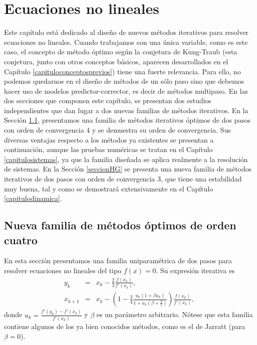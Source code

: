 
\chapter{Ecuaciones no lineales}\label{capituloecuaciones}

Este capítulo está dedicado al diseño de nuevos métodos iterativos para resolver ecuaciones no lineales. Cuando trabajamos con una única variable, como es este caso, el concepto de método óptimo según la conjetura de Kung-Traub (esta conjetura, junto con otros conceptos básicos, aparecen desarrollados en el Capítulo \ref{capituloconceptosprevios}) tiene una fuerte relevancia. Para ello, no podemos quedarnos en el diseño de métodos de un sólo paso sino que debemos hacer uso de modelos predictor-corrector, es decir de métodos multipaso. En las dos secciones que componen este capítulo, se presentan dos estudios independientes que dan lugar a dos nuevas familias de métodos iterativos. En la Sección \ref{seccionlichen}, presentamos una familia de métodos iterativos óptimos de dos pasos con orden de convergencia 4 y se demuestra su orden de convergencia. Sus diversas ventajas respecto a los métodos ya existentes se presentan a continuación, aunque las pruebas numéricas se tratan en el Capítulo \ref{capitulosistemas}, ya que la familia diseñada se aplica realmente a la resolución de sistemas. En la Sección \ref{seccionHG} se presenta una nueva familia de métodos iterativos de dos pasos con orden de convergencia 3, que tiene una estabilidad muy buena, tal y como se demostrará extensivamente en el Capítulo \ref{capitulodinamica}.
\section{Nueva familia de métodos óptimos de orden cuatro}\label{seccionlichen}
En esta sección presentamos una familia uniparamétrica de dos pasos para resolver ecuaciones no lineales del tipo $f(x)=0$. Su expresión iterativa es
\begin{eqnarray}\label{1}
y_k&=&x_k-\frac{2}{3}\frac{f(x_k)}{f'(x_k)},\\
x_{k+1}&=&x_k-\left(1-\frac{3}{4} \frac{u_k(1+\beta u_k)}{1+u_k
	(\beta+\frac{3}{2})}\right)\frac{f(x_k)}{f'(x_k)},\nonumber
\end{eqnarray}
donde $u_k=\frac{f'(y_k)-f'(x_k)}{f'(x_k)}$ y $\beta$ es un parámetro arbitrario. Nótese que esta familia contiene algunos de los ya bien conocidos métodos, como es el de Jarratt \cite{Jarratt} (para $\beta=0$).

